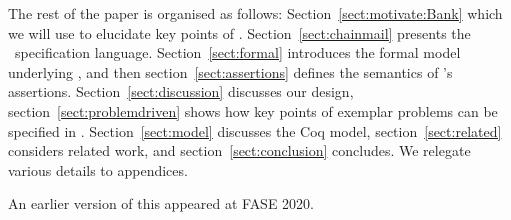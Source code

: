 
  
The rest of the paper is organised as follows:
Section~\ref{sect:motivate:Bank} 
 which we will use 
to elucidate key points of \Chainmail.
Section~\ref{sect:chainmail} presents the \Chainmail\ specification
language.  Section~\ref{sect:formal} introduces the formal model
underlying \Chainmail, and then section~\ref{sect:assertions} defines
the 
semantics of \Chainmail's assertions.
Section~\ref{sect:discussion}
discusses our design, section~\ref{sect:problemdriven} shows how key points of 
exemplar problems can be specified in \Chainmail. Section~\ref{sect:model} discusses the Coq model, section~\ref{sect:related} considers related
work, and section~\ref{sect:conclusion} concludes.
We relegate various details to appendices. 

An earlier version of this  appeared at FASE 2020. 
